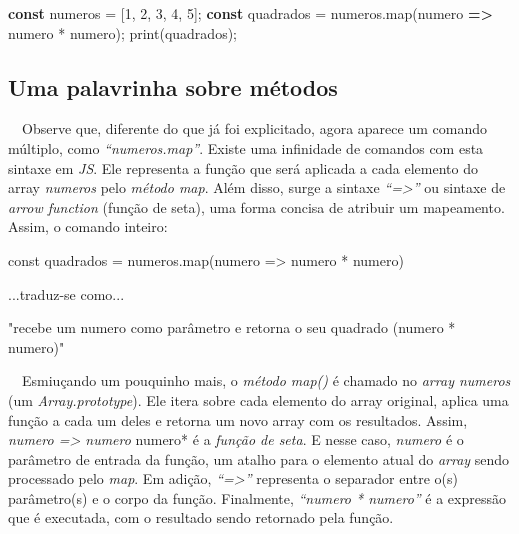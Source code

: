 \documentclass[
  portuguese,
  letterpaper,
  DIV=11,
  numbers=noendperiod]{scrreprt}
\newenvironment{Shaded}{\begin{snugshade}}{\end{snugshade}}
\newcommand{\DecValTok}[1]{\textcolor[rgb]{0.68,0.00,0.00}{#1}}
\newcommand{\FunctionTok}[1]{\textcolor[rgb]{0.28,0.35,0.67}{#1}}
\newcommand{\KeywordTok}[1]{\textcolor[rgb]{0.00,0.23,0.31}{\textbf{#1}}}
\newcommand{\NormalTok}[1]{\textcolor[rgb]{0.00,0.23,0.31}{#1}}
\newcommand{\OperatorTok}[1]{\textcolor[rgb]{0.37,0.37,0.37}{#1}}
\begin{document}
\begin{Shaded}
\begin{Highlighting}[]
\KeywordTok{const}\NormalTok{ numeros }\OperatorTok{=}\NormalTok{ [}\DecValTok{1}\OperatorTok{,} \DecValTok{2}\OperatorTok{,} \DecValTok{3}\OperatorTok{,} \DecValTok{4}\OperatorTok{,} \DecValTok{5}\NormalTok{]}\OperatorTok{;}
\KeywordTok{const}\NormalTok{ quadrados }\OperatorTok{=}\NormalTok{ numeros}\OperatorTok{.}\FunctionTok{map}\NormalTok{(numero }\KeywordTok{=\textgreater{}}\NormalTok{ numero }\OperatorTok{*}\NormalTok{ numero)}\OperatorTok{;}
\FunctionTok{print}\NormalTok{(quadrados)}\OperatorTok{;}
\end{Highlighting}
\end{Shaded}

\subsection{Uma palavrinha sobre
métodos}\label{uma-palavrinha-sobre-muxe9todos}

~~Observe que, diferente do que já foi explicitado, agora aparece um
comando múltiplo, como \emph{``numeros.map''}. Existe uma infinidade de
comandos com esta sintaxe em \emph{JS}. Ele representa a função que será
aplicada a cada elemento do array \emph{numeros} pelo \emph{método map}.
Além disso, surge a sintaxe \emph{``=\textgreater{}''} ou sintaxe de
\emph{arrow function} (função de seta), uma forma concisa de atribuir um
mapeamento. Assim, o comando inteiro:

\begin{Shaded}
\begin{Highlighting}[]
\NormalTok{const quadrados = numeros.map(numero =\textgreater{} numero * numero)}

\NormalTok{...traduz{-}se como...}

\NormalTok{"recebe um numero como parâmetro e retorna o seu quadrado (numero * numero)"}
\end{Highlighting}
\end{Shaded}

~~Esmiuçando um pouquinho mais, o \emph{método map()} é chamado no
\emph{array numeros} (um \emph{Array.prototype}). Ele itera sobre cada
elemento do array original, aplica uma função a cada um deles e retorna
um novo array com os resultados. Assim, \emph{numero =\textgreater{}
numero } numero* é a \emph{função de seta}. E nesse caso, \emph{numero}
é o parâmetro de entrada da função, um atalho para o elemento atual do
\emph{array} sendo processado pelo \emph{map}. Em adição,
\emph{``=\textgreater{}''} representa o separador entre o(s)
parâmetro(s) e o corpo da função. Finalmente, \emph{``numero * numero''}
é a expressão que é executada, com o resultado sendo retornado pela
função.
\end{document}
